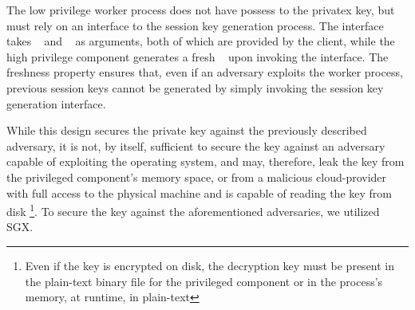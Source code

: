 \documentclass[../main.tex]{subfiles}
\begin{document}
The low privilege worker process does not have possess to the privatex
key, but must rely on an interface to the session key generation
process. The interface takes \crandom~ and \premaster~ as arguments,
both of which are provided by the client, while the high privilege
component generates a fresh \srandom~ upon invoking the interface. The
freshness property ensures that, even if an adversary exploits the
worker process, previous session keys cannot be generated by simply
invoking the session key generation interface.

While this design secures the private key against the previously
described adversary, it is not, by itself, sufficient to secure the
key against an adversary capable of exploiting the operating system,
and may, therefore, leak the key from the privileged component's
memory space, or from a malicious cloud-provider with full access to
the physical machine and is capable of reading the key from disk
\footnote{Even if the key is encrypted on disk, the decryption key
  must be present in the plain-text binary file for the privileged
  component or in the process's memory, at runtime, in plain-text}. To
secure the key against the aforementioned adversaries, we utilized
SGX.
\end{document}
